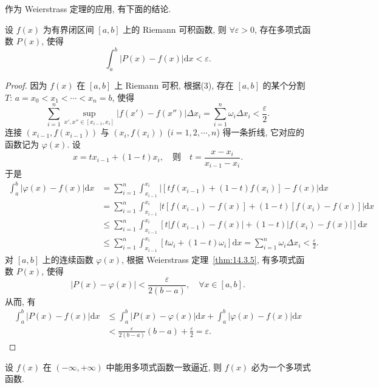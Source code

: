 作为 Weierstrass 定理的应用, 有下面的结论.

\begin{theorem}\label{thm:14.3.7}
设 $f(x)$ 为有界闭区间 $[a,b]$ 上的 Riemann 可积函数, 则 $\forall\varepsilon>0$, 存在多项式函数 $P(x)$, 使得
\[
  \int_{a}^{b}|P(x)-f(x)|\mathrm{d}x<\varepsilon.
\]
\end{theorem}

\begin{proof}
因为 $f(x)$ 在 $[a,b]$ 上 Riemann 可积, 根据(3), 存在 $[a,b]$ 的某个分割 $T$: $a=x_{0}<x_{1}<\cdots<x_{n}=b$, 使得
\[
  \sum_{i=1}^{n}\sup_{x',x''\in[x_{i-1},x_{i}]}|f(x')-f(x'')|\Delta x_{i}=\sum_{i=1}^{n}\omega_{i}\Delta x_{i}<\frac{\varepsilon}{2}.
\]
连接 $(x_{i-1},f(x_{i-1}))$ 与 $(x_{i},f(x_{i}))$ ($i=1,2,\cdots,n$) 得一条折线, 它对应的函数记为 $\varphi(x)$. 设
\[
  x=tx_{i-1}+(1-t)x_{i},\quad\text{则}\quad t=\frac{x-x_{i}}{x_{i-1}-x_{i}}.
\]
于是
\[
  \begin{aligned}
    \int_{a}^{b}|\varphi(x)-f(x)|\mathrm{d}x&=\sum_{i=1}^{n}\int_{x_{i-1}}^{x_{i}}\left|\left[tf(x_{i-1})+(1-t)f(x_{i})\right]-f(x)\right|\mathrm{d}x\\
    &=\sum_{i=1}^{n}\int_{x_{i-1}}^{x_{i}}\left|t\left[f(x_{i-1})-f(x)\right]+(1-t)\left[f(x_{i})-f(x)\right]\right|\mathrm{d}x\\
    &\leqslant\sum_{i=1}^{n}\int_{x_{i-1}}^{x_{i}}\left[t|f(x_{i-1})-f(x)|+(1-t)|f(x_{i})-f(x)|\right]\mathrm{d}x\\
    &\leqslant\sum_{i=1}^{n}\int_{x_{i-1}}^{x_{i}}\left[t\omega_{i}+(1-t)\omega_{i}\right]\mathrm{d}x=\sum_{i=1}^{n}\omega_{i}\Delta x_{i}<\frac{\varepsilon}{2}.
  \end{aligned}
\]
对 $[a,b]$ 上的连续函数 $\varphi(x)$, 根据 Weierstrass 定理~\ref{thm:14.3.5}, 有多项式函数 $P(x)$, 使得
\[
  |P(x)-\varphi(x)|<\frac{\varepsilon}{2(b-a)},\quad\forall x\in[a,b].
\]
从而, 有
\[
  \begin{aligned}
    \int_{a}^{b}|P(x)-f(x)|\mathrm{d}x&\leqslant\int_{a}^{b}|P(x)-\varphi(x)|\mathrm{d}x+\int_{a}^{b}|\varphi(x)-f(x)|\mathrm{d}x\\
    &<\frac{\varepsilon}{2(b-a)}(b-a)+\frac{\varepsilon}{2}=\varepsilon.
  \end{aligned}
\]
\end{proof}

\begin{example}\label{ex:14.3.3}
设 $f(x)$ 在 $(-\infty,+\infty)$ 中能用多项式函数一致逼近, 则 $f(x)$ 必为一个多项式函数.
\end{example}

